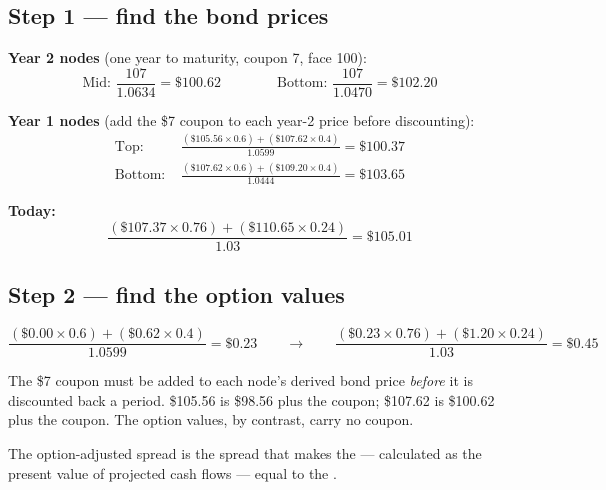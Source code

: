 \subsection{Step 1 --- find the bond prices}
\begin{mrexbox}
\small
\textbf{Year 2 nodes} (one year to maturity, coupon 7, face 100):
\[ \text{Mid: } \frac{107}{1.0634} = \$100.62 \qquad\qquad
   \text{Bottom: } \frac{107}{1.0470} = \$102.20 \]

\textbf{Year 1 nodes} (add the \$7 coupon to each year-2 price before discounting):
\begin{align*}
\text{Top: } &\frac{(\$105.56 \times 0.6) + (\$107.62 \times 0.4)}{1.0599} = \$100.37\\[3pt]
\text{Bottom: } &\frac{(\$107.62 \times 0.6) + (\$109.20 \times 0.4)}{1.0444} = \$103.65
\end{align*}

\textbf{Today:}
\[ \frac{(\$107.37 \times 0.76) + (\$110.65 \times 0.24)}{1.03} = \$105.01 \]
\end{mrexbox}

\subsection{Step 2 --- find the option values}
\begin{mrexbox}
\small
\[ \frac{(\$0.00 \times 0.6) + (\$0.62 \times 0.4)}{1.0599} = \$0.23
   \qquad\longrightarrow\qquad
   \frac{(\$0.23 \times 0.76) + (\$1.20 \times 0.24)}{1.03} = \mathbf{\$0.45} \]
\end{mrexbox}

\begin{mrtrapbox}[title={The step people drop}]
The \$7 coupon must be added to each node's derived bond price \textit{before} it is discounted
back a period. \$105.56 is \$98.56 plus the coupon; \$107.62 is \$100.62 plus the coupon. The
option values, by contrast, carry no coupon.
\end{mrtrapbox}


\begin{mrdefbox}[title={Option-adjusted spread}]
The option-adjusted spread is the spread that makes the  --- calculated as the
present value of projected cash flows --- equal to the .
\end{mrdefbox}

